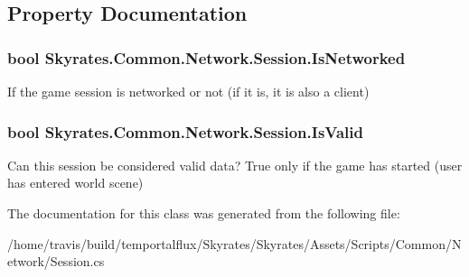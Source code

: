 \subsection{Property Documentation}
\hypertarget{class_skyrates_1_1_common_1_1_network_1_1_session_a9502bbd3da8fd21ef48dd05afd2e3743}{
\subsubsection[{Is\-Networked}]{\setlength{\rightskip}{0pt plus 5cm}bool Skyrates.\-Common.\-Network.\-Session.\-Is\-Networked\hspace{0.3cm}{\ttfamily [get]}}}\label{class_skyrates_1_1_common_1_1_network_1_1_session_a9502bbd3da8fd21ef48dd05afd2e3743}


If the game session is networked or not (if it is, it is also a client) 

\hypertarget{class_skyrates_1_1_common_1_1_network_1_1_session_a73011cb9fda86ee41cf5964989d1b9c2}{
\subsubsection[{Is\-Valid}]{\setlength{\rightskip}{0pt plus 5cm}bool Skyrates.\-Common.\-Network.\-Session.\-Is\-Valid\hspace{0.3cm}{\ttfamily [get]}}}\label{class_skyrates_1_1_common_1_1_network_1_1_session_a73011cb9fda86ee41cf5964989d1b9c2}


Can this session be considered valid data? True only if the game has started (user has entered world scene) 



The documentation for this class was generated from the following file\-:\begin{DoxyCompactItemize}
\item 
/home/travis/build/temportalflux/\-Skyrates/\-Skyrates/\-Assets/\-Scripts/\-Common/\-Network/Session.\-cs\end{DoxyCompactItemize}
